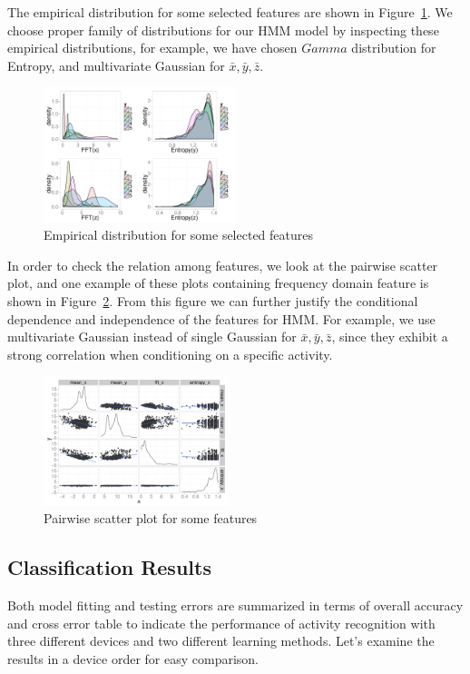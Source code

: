 The empirical distribution for some selected features are shown in Figure~\ref{fig:features}. We choose proper family of distributions for our HMM model by inspecting these empirical distributions, for example, we have chosen $Gamma$ distribution for Entropy, and multivariate Gaussian for $\bar{x},\bar{y},\bar{z}$. 

\begin{figure}
  \centering
  \includegraphics[width=0.5\textwidth]{figures/edafeature2.pdf}
  \caption{Empirical distribution for some selected features}
  \label{fig:features}
\end{figure}

In order to check the relation among features, we look at the pairwise scatter plot, and one  example of these plots containing frequency domain feature is shown in Figure~\ref{fig:pairwise}. From this figure we can further justify the conditional dependence and independence of the features for HMM. For example, we use multivariate Gaussian instead of 
single Gaussian for $\bar{x},\bar{y},\bar{z}$, since they exhibit a strong correlation when conditioning on a specific activity.

\begin{figure}
  \centering
  \includegraphics[width=0.48\textwidth]{figures/edafeature1.pdf}
  \caption{Pairwise scatter plot for some features}
  \label{fig:pairwise}
\end{figure}

\subsection{Classification Results}
Both model fitting and testing errors are summarized in terms of overall accuracy and cross error table to indicate the performance of activity recognition with three different devices and two different learning methods. Let's examine the results in a device order for easy comparison.

